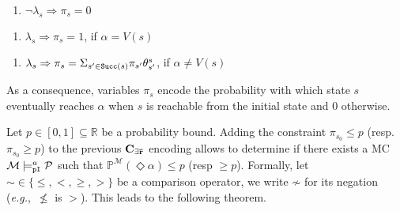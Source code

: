 \documentclass{llncs}
\newcommand{\mc}{\textnormal{MC}}
\newcommand{\satisfactionPimc}{\ensuremath{\models^a_{\tt{pI}}}}
\newcommand{\MerExt}{\ensuremath{{\bf C_{{\exists}\bar{r}}}}}
\newcommand{\eg} {{\em e.g.},\ }
\newcommand{\ttransition}[1]{\ensuremath{\theta_{#1}}}
\newcommand{\transition}[2]{\ensuremath{\ttransition{#1}^{#2}}}
\newcommand{\Succ}{\ensuremath{{\tt{Succ}}}}
\newcommand{\Rset}             {\ensuremath{\mathbb{R}}}
\newcommand{\ltlExists}{\ensuremath{\Diamond}}
\newcommand{\comment}[2]{{\color{gray}{\small{\underline{#1:} #2}}}}
\newcommand{\benoit}[1]{\marginpar{\comment{Beno\^it}{#1}}}%
\newcommand{\enumerateConstraints}{
	\renewcommand{\labelenumi}{\theenumi}
	\renewcommand{\theenumi}{(\textbf{\arabic{enumi})}}}
\begin{document}
\begin{minipage}{0.93\textwidth}
  \begin{minipage}[t]{.45\textwidth}
    \begin{enumerate}
      \enumerateConstraints
      \setcounter{enumi}{15}
      \item {$\neg\lambda_s \Rightarrow \pi_s = 0$}%
    \end{enumerate}
  \end{minipage}
  \begin{minipage}[t]{.45\textwidth}
    \begin{enumerate}
      \enumerateConstraints
      \setcounter{enumi}{16}
      \item { $\lambda_s \Rightarrow \pi_s = 1$,
	if $\alpha = V(s)$}%
    \end{enumerate}
  \end{minipage}
  \begin{minipage}[t]{0.67\textwidth}
    \begin{enumerate}
      \enumerateConstraints
      \setcounter{enumi}{17}
      \item { $ 
		\lambda_s \Rightarrow \pi_s = \Sigma_{s^{\prime} \in \Succ(s)} \pi_{s^\prime} \transition{s^\prime}{s}$,
		\hfill if $\alpha \ne V(s)$}%
    \end{enumerate}
  \end{minipage}  
\end{minipage}

\smallskip


As a consequence, variables $\pi_s$ encode the probability with which
state $s$ eventually reaches $\alpha$ when $s$ is reachable from the
initial state and $0$ otherwise.

Let $p \in [0, 1] \subseteq \Rset$ be a probability bound.  Adding the
constraint $\pi_{s_0} \leq p$ (resp. $\pi_{s_0} \geq p$) to the
previous {\MerExt} encoding allows to determine if there exists a
{\mc} $\mathcal{M} \satisfactionPimc \mathcal{P}$ such that
$\mathbb{P}^{\mathcal{M}} (\ltlExists \alpha) \le p$ (resp $\ge p$).
Formally, let ${\sim} \in \{\leq, <, \geq, >\}$ be a comparison operator,
we write $\not\sim$ for its negation (\eg $\not\leq$ is $>$).
This leads to the following theorem.
\end{document}
